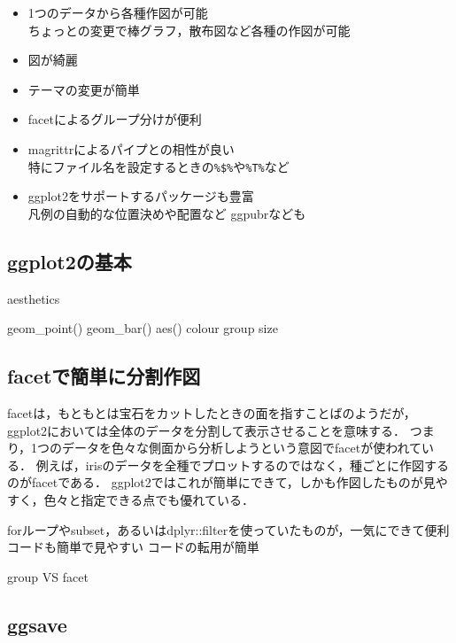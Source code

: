 \documentclass[
]{article}
\providecommand{\tightlist}{%
  \setlength{\itemsep}{0pt}\setlength{\parskip}{0pt}}
\begin{document}
\begin{itemize}
\tightlist
\item
  1つのデータから各種作図が可能\\
  ちょっとの変更で棒グラフ，散布図など各種の作図が可能\\
\item
  図が綺麗\\
\item
  テーマの変更が簡単\\
\item
  facetによるグループ分けが便利\\
\item
  magrittrによるパイプとの相性が良い\\
  特にファイル名を設定するときの\texttt{\%\$\%}や\texttt{\%T\%}など\\
\item
  ggplot2をサポートするパッケージも豊富\\
  凡例の自動的な位置決めや配置など
  ggpubrなども
\end{itemize}

\hypertarget{ggplot2ux306eux57faux672c}{%
\subsection{ggplot2の基本}\label{ggplot2ux306eux57faux672c}}

aesthetics

geom\_point()
geom\_bar()
aes()
colour
group
size

\hypertarget{facetux3067ux7c21ux5358ux306bux5206ux5272ux4f5cux56f3}{%
\subsection{facetで簡単に分割作図}\label{facetux3067ux7c21ux5358ux306bux5206ux5272ux4f5cux56f3}}

facetは，もともとは宝石をカットしたときの面を指すことばのようだが，ggplot2においては全体のデータを分割して表示させることを意味する．
つまり，1つのデータを色々な側面から分析しようという意図でfacetが使われている．
例えば，irisのデータを全種でプロットするのではなく，種ごとに作図するのがfacetである．
ggplot2ではこれが簡単にできて，しかも作図したものが見やすく，色々と指定できる点でも優れている．

forループやsubset，あるいはdplyr::filterを使っていたものが，一気にできて便利
コードも簡単で見やすい
コードの転用が簡単

group VS facet

\hypertarget{ggsave}{%
\subsection{ggsave}\label{ggsave}}
\end{document}
